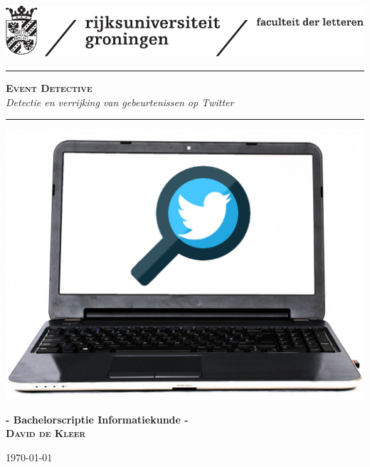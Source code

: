 
\begin{titlepage}
\begin{center}
\setcounter{page}{0}


\vspace*{-2cm}
\includegraphics[scale=1]{logo.pdf}

\vspace{2.5 cm}

\hrule
\vspace{1 cm}
\Huge{\textbf{\textsc{Event Detective}}}\\
\vspace{0.5 cm}
\LARGE{\textit{Detectie en verrijking van gebeurtenissen op Twitter}}

\vspace{1 cm}
\hrule
\vspace{1.5 cm}

\includegraphics[scale=0.3]{computer.jpg}
\vfill

\vspace{1 cm}
\LARGE{\textbf{- Bachelorscriptie Informatiekunde -\\}}
\vspace{1.5 cm}
\Large{\textsc{\textbf{David de Kleer}}}
\vspace{0.5 cm}

\vrule
\hspace{0.2 cm}
\normalsize{\today}
\hspace{0.2 cm}
\vrule
\end{center}
\end{titlepage}
